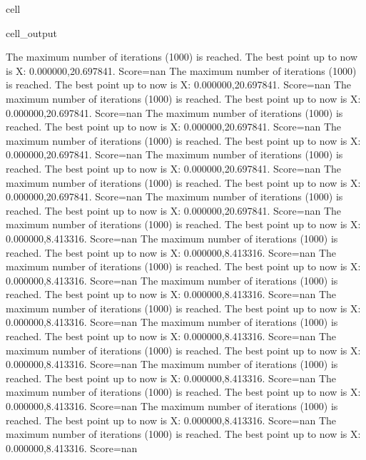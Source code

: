 \documentclass[letterpaper,10pt,english]{jupyterBook}
\begin{document}
\begin{sphinxuseclass}{cell}
\begin{sphinxVerbatimOutput}
\begin{sphinxuseclass}{cell_output}
\begin{sphinxVerbatim}[commandchars=\\\{\}]
The maximum number of iterations (1000) is reached. The best point up to now is X: \PYGZob{}0.000000,20.697841\PYGZcb{}. Score=\PYGZhy{}nan
The maximum number of iterations (1000) is reached. The best point up to now is X: \PYGZob{}0.000000,20.697841\PYGZcb{}. Score=\PYGZhy{}nan
The maximum number of iterations (1000) is reached. The best point up to now is X: \PYGZob{}0.000000,20.697841\PYGZcb{}. Score=\PYGZhy{}nan
The maximum number of iterations (1000) is reached. The best point up to now is X: \PYGZob{}0.000000,20.697841\PYGZcb{}. Score=\PYGZhy{}nan
The maximum number of iterations (1000) is reached. The best point up to now is X: \PYGZob{}0.000000,20.697841\PYGZcb{}. Score=\PYGZhy{}nan
The maximum number of iterations (1000) is reached. The best point up to now is X: \PYGZob{}0.000000,20.697841\PYGZcb{}. Score=\PYGZhy{}nan
The maximum number of iterations (1000) is reached. The best point up to now is X: \PYGZob{}0.000000,20.697841\PYGZcb{}. Score=\PYGZhy{}nan
The maximum number of iterations (1000) is reached. The best point up to now is X: \PYGZob{}0.000000,20.697841\PYGZcb{}. Score=\PYGZhy{}nan
The maximum number of iterations (1000) is reached. The best point up to now is X: \PYGZob{}0.000000,8.413316\PYGZcb{}. Score=\PYGZhy{}nan
The maximum number of iterations (1000) is reached. The best point up to now is X: \PYGZob{}0.000000,8.413316\PYGZcb{}. Score=\PYGZhy{}nan
The maximum number of iterations (1000) is reached. The best point up to now is X: \PYGZob{}0.000000,8.413316\PYGZcb{}. Score=\PYGZhy{}nan
The maximum number of iterations (1000) is reached. The best point up to now is X: \PYGZob{}0.000000,8.413316\PYGZcb{}. Score=\PYGZhy{}nan
The maximum number of iterations (1000) is reached. The best point up to now is X: \PYGZob{}0.000000,8.413316\PYGZcb{}. Score=\PYGZhy{}nan
The maximum number of iterations (1000) is reached. The best point up to now is X: \PYGZob{}0.000000,8.413316\PYGZcb{}. Score=\PYGZhy{}nan
The maximum number of iterations (1000) is reached. The best point up to now is X: \PYGZob{}0.000000,8.413316\PYGZcb{}. Score=\PYGZhy{}nan
The maximum number of iterations (1000) is reached. The best point up to now is X: \PYGZob{}0.000000,8.413316\PYGZcb{}. Score=\PYGZhy{}nan
The maximum number of iterations (1000) is reached. The best point up to now is X: \PYGZob{}0.000000,8.413316\PYGZcb{}. Score=\PYGZhy{}nan
The maximum number of iterations (1000) is reached. The best point up to now is X: \PYGZob{}0.000000,8.413316\PYGZcb{}. Score=\PYGZhy{}nan
The maximum number of iterations (1000) is reached. The best point up to now is X: \PYGZob{}0.000000,8.413316\PYGZcb{}. Score=\PYGZhy{}nan

\end{sphinxVerbatim}
\end{sphinxuseclass}
\end{sphinxVerbatimOutput}
\end{sphinxuseclass}
\end{document}
